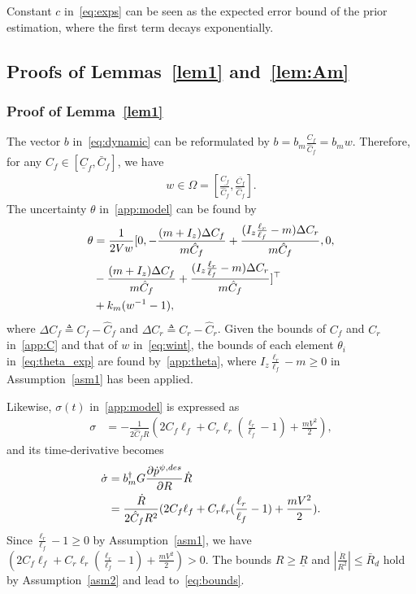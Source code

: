 \documentclass[letterpaper, 10 pt, conference]{ieeeconf}
\begin{document}
Constant $c$ in~\eqref{eq:exps} can be seen as the expected error bound of the prior estimation, where the first term decays exponentially.

\subsection{Proofs of Lemmas~\ref{lem1} and~\ref{lem:Am}}\label{app:proof}

\subsubsection{Proof of Lemma~\ref{lem1}}
The vector $b$ in~\eqref{eq:dynamic} can be reformulated by
$b = b_m \frac{C_f}{\hat{C}_f} = b_m w$.
Therefore, for any $C_f \in [\underline{C}_f,\bar{C}_f]$, we have
\begin{align}
w \in \Omega = [\frac{\underline{C_f}}{\hat{C}_f},\frac{\bar{C_f}}{\hat{C}_f}].
\label{eq:wint}
\end{align}
The uncertainty $\theta$ in~\eqref{app:model} can be found by
\begin{align}
    \theta &= \frac{1}{2  Vw}[0,-\frac{(m+I_z)\Delta C_f}{m  \hat{C}_f}+\frac{(I_z\frac{\ell_r}{\ell_f}-m)\Delta C_r}{m  \hat{C}_f},0,\nonumber\\
    &-\frac{(m+I_z)\Delta C_f}{m  \hat{C}_f}+\frac{(I_z\frac{\ell_r}{\ell_f}-m)\Delta C_r}{m  \hat{C}_f}]^\top\nonumber\\
    &+ k_m (w^{-1}-1),
    \label{eq:theta_exp}
\end{align}
where $\Delta C_f \triangleq C_f-\hat{C}_f$ and $\Delta C_r \triangleq C_r-\hat{C}_r$.
Given the bounds of $C_f$ and $C_r$ in~\eqref{app:C} and that of $w$ in~\eqref{eq:wint}, 
the bounds of each element $\theta_i$ in~\eqref{eq:theta_exp}
are found by~\eqref{app:theta}, where $I_z\frac{\ell_r}{\ell_f}-m \geq 0$ in Assumption~\ref{asm1} has been applied.

Likewise, $\sigma(t)$ in~\eqref{app:model} is expressed as
\begin{align*}
    \sigma %
    &=-\frac{1}{2\hat{C}_f R}(2C_f\ell_f+C_r\ell_r(\frac{\ell_r}{\ell_f}-1)+\frac{mV^2}{2}),
\end{align*}
and its time-derivative becomes
\begin{align*}
    \dot{\sigma} &= b_m^\dagger G \frac{\partial \dot{p}^{\psi,des}}{\partial R}\dot{R}\nonumber\\
    &=\frac{\dot{R}}{2\hat{C}_f R^2}(2C_f\ell_f+C_r\ell_r(\frac{\ell_r}{\ell_f}-1)+\frac{mV^2}{2}).
\end{align*}
Since $\frac{\ell_r}{\ell_f}-1 \geq 0$ by Assumption~\ref{asm1}, we have
$(2C_f\ell_f+C_r\ell_r(\frac{\ell_r}{\ell_f}-1)+\frac{mV^2}{2})>0$.
The bounds $R\geq \underline{R}$ and $|\frac{\dot{R}}{R^2}| \leq \bar{R}_d$  hold by Assumption~\ref{asm2} and lead to~\eqref{eq:bounds}.\oprocend\\
\end{document}
